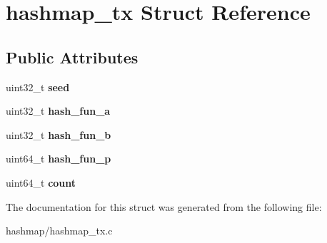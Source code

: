 \hypertarget{structhashmap__tx}{}\section{hashmap\+\_\+tx Struct Reference}
\label{structhashmap__tx}
\subsection*{Public Attributes}
\begin{DoxyCompactItemize}
\item 
\mbox{\label{structhashmap__tx_a3a3693aa60920c724a0f4511b18a6fd2}} 
uint32\+\_\+t {\bfseries seed}
\item 
\mbox{\label{structhashmap__tx_aff7708436836d0ae87500fa876dfcecf}} 
uint32\+\_\+t {\bfseries hash\+\_\+fun\+\_\+a}
\item 
\mbox{\label{structhashmap__tx_a9f6c8ffb7a4f3472edb7afeb99e45074}} 
uint32\+\_\+t {\bfseries hash\+\_\+fun\+\_\+b}
\item 
\mbox{\label{structhashmap__tx_adc5b9769a040542bda4f25e3098f2837}} 
uint64\+\_\+t {\bfseries hash\+\_\+fun\+\_\+p}
\item 
\mbox{\label{structhashmap__tx_a70fbb5e277e0e52c199c1024cfbd08c1}} 
uint64\+\_\+t {\bfseries count}
\end{DoxyCompactItemize}


The documentation for this struct was generated from the following file\+:\begin{DoxyCompactItemize}
\item 
hashmap/hashmap\+\_\+tx.\+c\end{DoxyCompactItemize}
